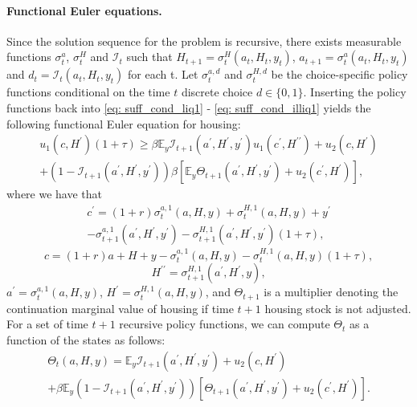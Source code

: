 \documentclass[12pt]{article}
\begin{document}
\paragraph{Functional Euler equations.} Since the solution sequence for the problem is recursive, there exists measurable functions $\sigma^{a}_{t}$, $\sigma^{H}_{t}$ and $\mathcal{I}_{t}$ such that $H_{t+1} = \sigma^{H}_{t}(a_{t}, H_{t}, y_{t})$, $a_{t+1} = \sigma^{a}_{t}(a_{t}, H_{t}, y_{t})$ and $d_{t}= \mathcal{I}_{t}(a_{t}, H_{t}, y_{t})$ for each t. Let $\sigma^{a,d}_{t}$ and $\sigma^{H,d}_{t}$ be the choice-specific policy functions conditional on the time $t$ discrete choice $d\in \{0,1\}$. Inserting the policy functions back into \eqref{eq: suff_cond_liq1} - \eqref{eq: suff_cond_illiq1} yields the following functional Euler equation for housing:
%
\begin{multline}\label{eq: suff_cond_liq2}
    u_{1}(c, H^{\prime})(1+ \tau) \geq \beta \mathbb{E}_{y}\mathcal{I}_{t+1}(a^{\prime}, H^{\prime}, y^{\prime})u_{1}(c^{\prime}, H^{\prime\prime}) + u_{2}(c, H^{\prime}) \\ + (1-\mathcal{I}_{t+1}(a^{\prime}, H^{\prime}, y^{\prime}))\beta \left[\mathbb{E}_{y}\Theta_{t+1}(a^{\prime}, H^{\prime}, y^{\prime}) + u_{2}(c^{\prime}, H^{\prime})\right],
\end{multline}
%
where we have that
\begin{multline}\label{eq: c_def_1}
    c^{\prime} = (1+r)\sigma^{a,1}_{t}(a,H,y) + \sigma^{H,1}_{t}(a,H,y) + y^{\prime} \\ - \sigma^{a,1}_{t+1}(a^{\prime},H^{\prime},y^{\prime}) - \sigma^{H,1}_{t+1}(a^{\prime},H^{\prime},y^{\prime})(1+\tau),
\end{multline}
%
\begin{equation}\label{eq: c_def_2}
        c = (1+r)a + H + y - \sigma^{a,1}_{t}(a,H,y) - \sigma^{H,1}_{t}(a,H,y)(1+ \tau),
\end{equation}
%
\begin{equation}\label{eq: c_def_3}
        H^{\prime\prime} = \sigma^{H,1}_{t+1}(a^{\prime},H^{\prime},y),
\end{equation}
%
$a^{\prime} =\sigma^{a,1}_{t}(a,H,y)$, $H^{\prime} =\sigma^{H,1}_{t}(a,H,y)$, and $\Theta_{t+1}$ is a multiplier denoting the continuation marginal value of housing if time $t+1$ housing stock is not adjusted. For a set of time $t+1$ recursive policy functions, we can compute $\Theta_{t}$ as a function of the states as follows:
%
\begin{multline}
    \Theta_{t}(a,H,y) = \mathbb{E}_{y}\mathcal{I}_{t+1}(a^{\prime},H^{\prime}, y^{\prime})  + u_{2}(c, H^{\prime}) \\ + \beta \mathbb{E}_{y}(1- \mathcal{I}_{t+1}(a^{\prime}, H^{\prime}, y^{\prime}))\left[\Theta_{t+1}(a^{\prime}, H^{\prime}, y^{\prime}) + u_{2}(c^{\prime}, H^{\prime}) \right].
\end{multline}
\end{document}
